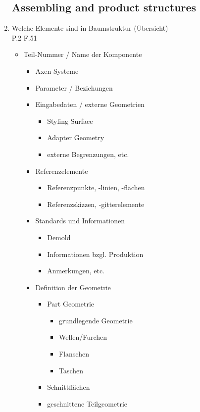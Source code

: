 \documentclass[10pt,a4paper,fleqn]{article}
\begin{document}
\begin{enumerate}
\subsection{Assembling and product structures}
	\item Welche Elemente sind in Baumstruktur (Übersicht)\\
		P.2 F.51
		\begin{itemize}
			\item Teil-Nummer / Name der Komponente
				\begin{itemize}
					\item Axen Systeme
					\item Parameter / Beziehungen
					\item Eingabedaten / externe Geometrien
						\begin{itemize}
							\item Styling Surface
							\item Adapter Geometry
							\item externe Begrenzungen, etc.
						\end{itemize}
					\item Referenzelemente
						\begin{itemize}
							\item Referenzpunkte, -linien, -flächen
							\item Referenzskizzen, -gitterelemente
						\end{itemize}
					\item Standards und Informationen
						\begin{itemize}
							\item Demold
							\item Informationen bzgl. Produktion
							\item Anmerkungen, etc.
						\end{itemize}
					\item Definition der Geometrie
						\begin{itemize}
							\item Part Geometrie
								\begin{itemize}
									\item grundlegende Geometrie
									\item Wellen/Furchen
									\item Flanschen
									\item Taschen
								\end{itemize}
							\item Schnittflächen
							\item geschnittene Teilgeometrie

\end{itemize}
\end{itemize}
\end{itemize}
\end{enumerate}
\end{document}
